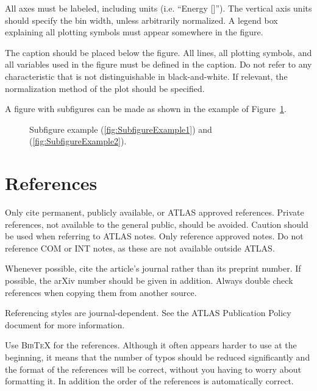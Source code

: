 \documentclass[UKenglish]{style/atlasdoc}
\newcommand{\BibTeX}{\textsc{Bib\TeX}}
\begin{document}
All axes must be labeled, including units (i.e. ``Energy [\gev]'').
The vertical axis units should specify the bin width, unless
arbitrarily normalized. A legend box explaining all plotting symbols
must appear somewhere in the figure.

The caption should be placed below the figure.  All lines, all
plotting symbols, and all variables used in the figure must be defined
in the caption. Do not refer to any characteristic that is not
distinguishable in black-and-white.  If relevant, the normalization
method of the plot should be specified.

A figure with subfigures can be made as shown in the example of
Figure~\ref{fig:subfigexample}.

\begin{figure}
  \centering
  \caption{Subfigure example (\ref{fig:SubfigureExample1}) and
    (\ref{fig:SubfigureExample2}).}
  \label{fig:subfigexample}
\end{figure}


\section{References}
\label{sec:refs}

Only cite permanent, publicly available, or ATLAS approved references.
Private references, not available to the general public, should be
avoided. Caution should be used when referring to ATLAS notes.
Only reference approved notes. Do not reference COM or INT notes,
as these are not available outside ATLAS.

Whenever possible, cite the article's journal rather than its preprint number. 
If possible, the arXiv number should be given in addition.
Always double check references when copying them from another source.

Referencing styles are journal-dependent. See the ATLAS Publication
Policy document for more information.

Use \BibTeX{} for the references. Although it often
appears harder to use at the beginning, it means that the number of
typos should be reduced significantly and the format of the references
will be correct, without you having to worry about formatting it. In
addition the order of the references is automatically correct.
\end{document}
